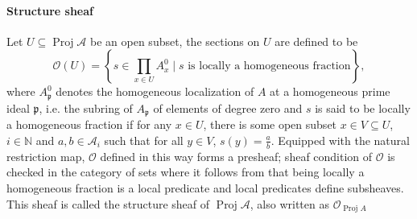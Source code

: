 \documentclass[a4paper,UKenglish,cleveref, autoref, thm-restate]{lipics-v2021}
\begin{document}
\paragraph*{Structure sheaf}
Let $U\subseteq \operatorname{Proj}\mathcal{A}$ be an open subset, the sections on $U$ are defined to be
$$
    \mathcal{O}(U) = \left\{s \in \prod_{x\in U}A_x^0\mid s\text{~is locally a homogeneous fraction}\right\},   
$$
where $A^0_{\mathfrak{p}}$ denotes the homogeneous localization of $A$ at a homogeneous prime ideal $\mathfrak{p}$, i.e. the subring of $A_{\mathfrak{p}}$ of elements of degree zero and $s$ is said to be locally a homogeneous fraction if for any $x \in U$, there is some open subset $x\in V \subseteq U$, $i\in\mathbb{N}$ and $a, b\in\mathcal{A}_i$ such that for all $y\in V$, $s(y)=\frac{a}{b}$. Equipped with the natural restriction map, $\mathcal{O}$ defined in this way forms a presheaf; sheaf condition of $\mathcal{O}$ is checked in the category of sets where it follows from that being locally a homogeneous fraction is a local predicate and local predicates define subsheaves. This sheaf is called the structure sheaf of $\operatorname{Proj}\mathcal{A}$, also written as $\mathcal{O}_{\operatorname{Proj} A}$
\end{document}
